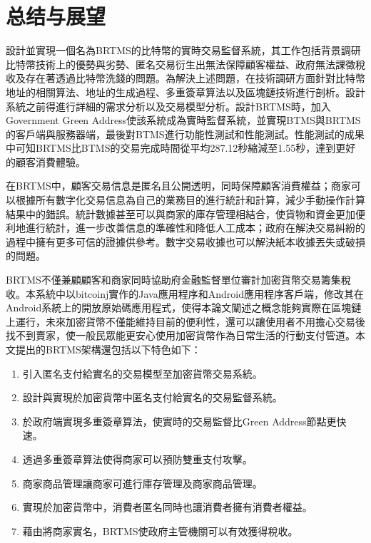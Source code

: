  
\chapter{总结与展望}
設計並實現一個名為BRTMS的比特幣的實時交易監督系統，其工作包括背景調研比特幣技術上的優勢與劣勢、匿名交易衍生出無法保障顧客權益、政府無法課徵稅收及存在著透過比特幣洗錢的問題。為解決上述問題，在技術調研方面針對比特幣地址的相關算法、地址的生成過程、多重簽章算法以及區塊鏈技術進行剖析。設計系統之前得進行詳細的需求分析以及交易模型分析。設計BRTMS時，加入Government Green Address使該系統成為實時監督系統，並實現BTMS與BRTMS的客戶端與服務器端，最後對BTMS進行功能性測試和性能測試。性能測試的成果中可知BRTMS比BTMS的交易完成時間從平均287.12秒縮減至1.55秒，達到更好的顧客消費體驗。

在BRTMS中，顧客交易信息是匿名且公開透明，同時保障顧客消費權益；商家可以根據所有數字化交易信息為自己的業務目的進行統計和計算，減少手動操作計算結果中的錯誤。統計數據甚至可以與商家的庫存管理相結合，使貨物和資金更加便利地進行統計，進一步改善信息的準確性和降低人工成本；政府在解決交易糾紛的過程中擁有更多可信的證據供參考。數字交易收據也可以解決紙本收據丟失或破損的問題。

BRTMS不僅兼顧顧客和商家同時協助府金融監督單位審計加密貨幣交易籌集稅收。本系統中以bitcoinj實作的Java應用程序和Android應用程序客戶端，修改其在Android系統上的開放原始碼應用程式，使得本論文闡述之概念能夠實際在區塊鏈上運行，未來加密貨幣不僅能維持目前的便利性，還可以讓使用者不用擔心交易後找不到賣家，使一般民眾能更安心使用加密貨幣作為日常生活的行動支付管道。本文提出的BRTMS架構還包括以下特色如下：

		\begin{enumerate}
			\item 引入匿名支付給實名的交易模型至加密貨幣交易系統。
			\item 設計與實現於加密貨幣中匿名支付給實名的交易監督系統。
			\item 於政府端實現多重簽章算法，使實時的交易監督比Green Address節點更快速。
			\item 透過多重簽章算法使得商家可以預防雙重支付攻擊。
			\item 商家商品管理讓商家可進行庫存管理及商家商品管理。
			\item 實現於加密貨幣中，消費者匿名同時也讓消費者擁有消費者權益。
			\item 藉由將商家實名，BRTMS使政府主管機關可以有效獲得稅收。
		\end{enumerate}

